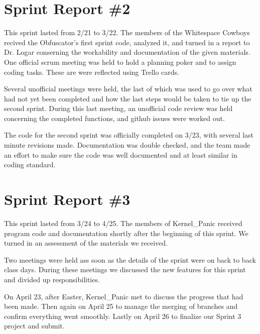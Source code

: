 \section{Sprint Report \#2}
This sprint lasted from 2/21 to 3/22. The members of the Whitespace Cowboys recived the Obfuscator's first sprint code, 
analyzed it, and turned in a report to Dr. Logar conserning the workability and documentation of the given materials. 
One official scrum meeting was held to hold a planning poker and to assign coding tasks. These are were reflected using 
Trello cards. 

Several unofficial meetings were held, the last of which was used to go over what had not yet been 
completed and how the last steps would be taken to tie up the second sprint. During this last meeting, an unofficial 
code review was held concerning the completed functions, and github issues were worked out.

The code for the second sprint was officially completed on 3/23, with several last minute 
revisions made. Documentation was double checked, and the team made an effort to make sure 
the code was well documented and at least similar in coding standard.

\section{Sprint Report \#3}
This sprint lasted from 3/24 to 4/25. The members of Kernel\_Panic received program code and documentation shortly after the beginning of this sprint. We turned in an assessment of the materials we received.

Two meetings were held ass soon as the details of the sprint were on back to back class days. During these meetings we discussed the new features for this sprint and divided up responsibilities.

On April 23, after Easter, Kernel\_Panic met to discuss the progress that had been made. Then again on April 25 to manage the merging of branches and confirm everything went smoothly. Lastly on April 26 to finalize our Sprint 3 project and submit.
